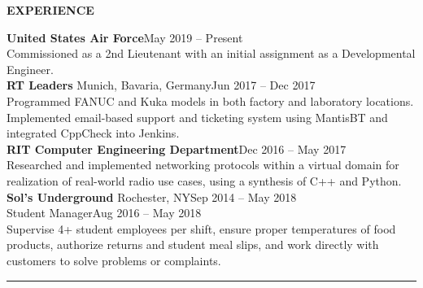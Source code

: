 \documentclass[11pt]{article}
\newcommand{\leftColSize}{0.22}		%
\newcommand{\rightColSize}{0.78}	%
\begin{document}
\begin{center}
    \begin{minipage}[t]{\leftColSize\textwidth}
        \textbf{EXPERIENCE}
    \end{minipage}%
    \begin{minipage}[t]{\rightColSize\textwidth}
        \textbf{United States Air Force}\hfill May 2019 -- Present\\
        Commissioned as a 2nd Lieutenant with an initial assignment as a Developmental Engineer.\\
        
        \textbf{RT Leaders} \textbar{} Munich, Bavaria, Germany\hfill Jun 2017 -- Dec 2017\\
        Programmed FANUC and Kuka models in both factory and laboratory locations. Implemented email-based support and ticketing system using MantisBT and integrated CppCheck into Jenkins.\\
        
        \textbf{RIT Computer Engineering Department}\hfill Dec 2016 -- May 2017\\
        Researched and implemented networking protocols within a virtual domain for realization of real-world radio use cases, using a synthesis of C++ and Python.\\
        
        \textbf{Sol's Underground} \textbar{} Rochester, NY\hfill Sep 2014 -- May 2018\\
        Student Manager\hfill Aug 2016 -- May 2018\\
        Supervise 4+ student employees per shift, ensure proper temperatures of food products, authorize returns and student meal slips, and work directly with customers to solve problems or complaints.
    \end{minipage}
\end{center}
\textcolor{black!20}{\rule{\textwidth}{3pt}}
\end{document}
